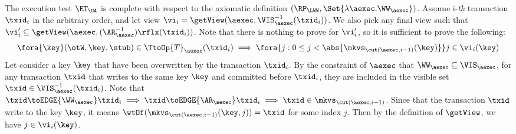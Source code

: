 The execution test $\ET_\UA$ is complete with respect to 
the axiomatic definition \( (\RP_{\LWW}, \Set{\lambda \aexec. \WW_\aexec }) \).
Assume i-\emph{th} transaction \( \txid_i \) in the arbitrary order,
and let view \( \vi_{i} = \getView(\aexec, \VIS^{-1}_{\aexec}(\txid_{i}) ) \).
We also pick any final view such that \( \vi'_{i} \subseteq \getView(\aexec, (\AR^{-1}_{\aexec})\rflx(\txid_{i}) ) \).
Note that there is nothing to prove for \( \vi'_i \),
so it is sufficient to prove the following:
\[
    \fora{\key} (\otW, \key, \stub) \in \TtoOp{T}_{\aexec}(\txid_{i}) 
    \implies 
    \fora{j : 0 \leq j < \abs{\mkvs_{\cut(\aexec, i-1)}(\key)}} j \in \vi_i(\key)
\]
Let consider a key \( \key \) that have been overwritten by the transaction \( \txid_i \).
By the constraint of \( \aexec \) that \( \WW_\aexec \subseteq \VIS_\aexec \),
for any transaction \( \txid \) that writes to the same key \( \key \) and committed before \( \txid_i \), 
they are included in the visible set \(\txid \in \VIS^{-1}_{\aexec}(\txid_{i}) \).
Note that \( \txid \toEDGE{\WW_\aexec} \txid_i \implies \txid \toEDGE{\AR_\aexec} \txid_i \implies \txid \in \mkvs_{\cut(\aexec,i-1)}\).
Since that the transaction \( \txid \) write to the key \( \key \),
it means \( \wtOf(\mkvs_{\cut(\aexec, i-1)}(\key,j)) = \txid \) for some index \( j \).
Then by the definition of \( \getView \), we have \( j \in \vi_i(\key)\).
